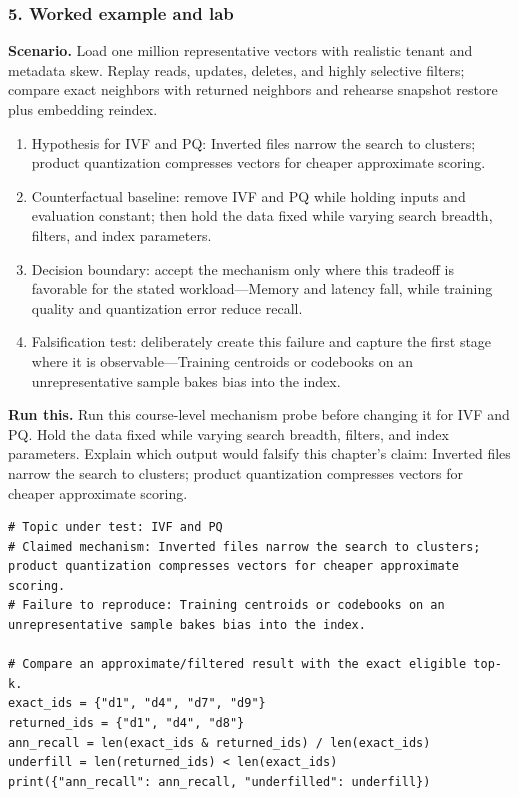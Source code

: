 \subsubsection*{5. Worked example and lab}
\textbf{Scenario.} Load one million representative vectors with realistic tenant and metadata skew. Replay reads, updates, deletes, and highly selective filters; compare exact neighbors with returned neighbors and rehearse snapshot restore plus embedding reindex.
\begin{enumerate}
\item Hypothesis for IVF and PQ: Inverted files narrow the search to clusters; product quantization compresses vectors for cheaper approximate scoring.
\item Counterfactual baseline: remove IVF and PQ while holding inputs and evaluation constant; then hold the data fixed while varying search breadth, filters, and index parameters.
\item Decision boundary: accept the mechanism only where this tradeoff is favorable for the stated workload—Memory and latency fall, while training quality and quantization error reduce recall.
\item Falsification test: deliberately create this failure and capture the first stage where it is observable—Training centroids or codebooks on an unrepresentative sample bakes bias into the index.
\end{enumerate}
\textbf{Run this.} Run this course-level mechanism probe before changing it for IVF and PQ. Hold the data fixed while varying search breadth, filters, and index parameters. Explain which output would falsify this chapter's claim: Inverted files narrow the search to clusters; product quantization compresses vectors for cheaper approximate scoring.
\begin{Verbatim}[fontsize=\scriptsize]
# Topic under test: IVF and PQ
# Claimed mechanism: Inverted files narrow the search to clusters; product quantization compresses vectors for cheaper approximate scoring.
# Failure to reproduce: Training centroids or codebooks on an unrepresentative sample bakes bias into the index.

# Compare an approximate/filtered result with the exact eligible top-k.
exact_ids = {"d1", "d4", "d7", "d9"}
returned_ids = {"d1", "d4", "d8"}
ann_recall = len(exact_ids & returned_ids) / len(exact_ids)
underfill = len(returned_ids) < len(exact_ids)
print({"ann_recall": ann_recall, "underfilled": underfill})
\end{Verbatim}
